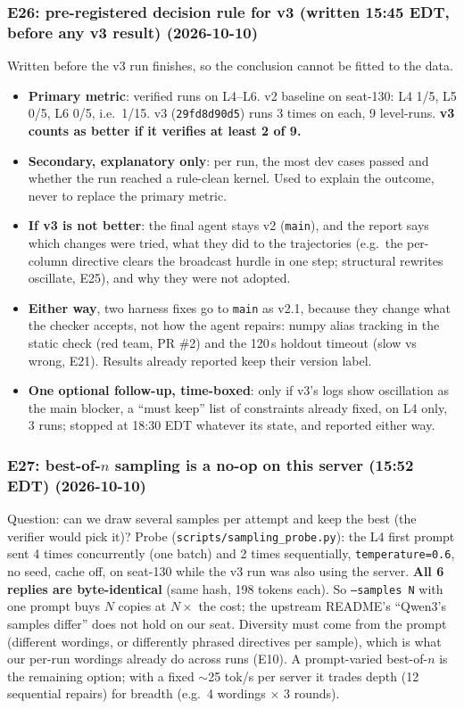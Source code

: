\documentclass[11pt]{article}
\newcommand{\code}[1]{\texttt{#1}}
\newcommand{\entry}[2]{\subsubsection*{#1 \textnormal{\small(#2)}}}
\begin{document}
\entry{E26: pre-registered decision rule for v3 (written 15:45 EDT, before any v3 result)}{2026-10-10}
Written before the v3 run finishes, so the conclusion cannot be fitted to the data.
\begin{itemize}
  \item \textbf{Primary metric}: verified runs on L4--L6. v2 baseline on seat-130: L4 1/5, L5 0/5,
        L6 0/5, i.e.\ 1/15. v3 (\code{29fd8d90d5}) runs 3 times on each, 9 level-runs. \textbf{v3 counts as
        better if it verifies at least 2 of 9.}
  \item \textbf{Secondary, explanatory only}: per run, the most dev cases passed and whether the run
        reached a rule-clean kernel. Used to explain the outcome, never to replace the primary metric.
  \item \textbf{If v3 is not better}: the final agent stays v2 (\code{main}), and the report says which
        changes were tried, what they did to the trajectories (e.g.\ the per-column directive clears the
        broadcast hurdle in one step; structural rewrites oscillate, E25), and why they were not adopted.
  \item \textbf{Either way}, two harness fixes go to \code{main} as v2.1, because they change what the
        checker accepts, not how the agent repairs: numpy alias tracking in the static check (red team,
        PR \#2) and the 120\,s holdout timeout (slow vs wrong, E21). Results already reported keep their
        version label.
  \item \textbf{One optional follow-up, time-boxed}: only if v3's logs show oscillation as the main
        blocker, a ``must keep'' list of constraints already fixed, on L4 only, 3 runs; stopped at 18:30
        EDT whatever its state, and reported either way.
\end{itemize}

\entry{E27: best-of-$n$ sampling is a no-op on this server (15:52 EDT)}{2026-10-10}
Question: can we draw several samples per attempt and keep the best (the verifier would pick it)?
Probe (\code{scripts/sampling\_probe.py}): the L4 first prompt sent 4 times concurrently (one batch)
and 2 times sequentially, \code{temperature=0.6}, no seed, cache off, on seat-130 while the v3 run was
also using the server. \textbf{All 6 replies are byte-identical} (same hash, 198 tokens each). So
\code{--samples N} with one prompt buys $N$ copies at $N\times$ the cost; the upstream README's
``Qwen3's samples differ'' does not hold on our seat. Diversity must come from the prompt (different
wordings, or differently phrased directives per sample), which is what our per-run wordings already
do across runs (E10). A prompt-varied best-of-$n$ is the remaining option; with a fixed $\sim$25 tok/s
per server it trades depth (12 sequential repairs) for breadth (e.g.\ 4 wordings $\times$ 3 rounds).
\end{document}
